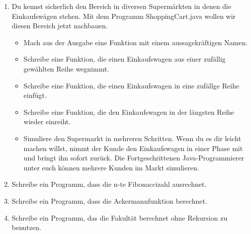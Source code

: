 \begin{enumerate}
	\item Du kennst sicherlich den Bereich in diversen Supermärkten in denen die Einkaufswägen stehen. Mit dem Programm ShoppingCart.java wollen wir diesen Bereich jetzt nachbauen.
	\begin{itemize}
		\item Mach aus der Ausgabe eine Funktion mit einem aussagekräftigen Namen.
		\item Schreibe eine Funktion, die einen Einkaufswagen aus einer zufällig gewählten Reihe wegnimmt.
		\item Schreibe eine Funktion, die einen Einkaufswagen in eine zufällge Reihe einfügt.
		\item Schreibe eine Funktion, die den Einkaufswagen in der längsten Reihe wieder einreiht.
		\item Simuliere den Supermarkt in mehreren Schritten. Wenn du es dir leicht machen willst, nimmt der Kunde den Einkaufswagen in einer Phase mit und bringt ihn sofort zurück. Die Fortgeschrittenen Java-Programmierer unter euch können mehrere Kunden im Markt simulieren.
	\end{itemize}
	\item Schreibe ein Programm, dass die n-te Fibonaccizahl ausrechnet.
	\item Schreibe ein Programm, dass die Ackermannfunktion berechnet.
	\item Schreibe ein Programm, das die Fakultät berechnet ohne Rekursion zu benutzen.
\end{enumerate}
